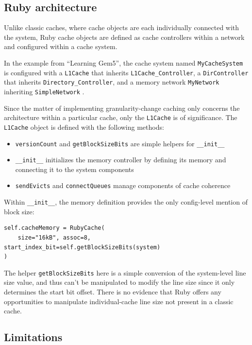 \documentclass[12pt,twoside]{reedthesis}
\begin{document}
	\subsection*{Ruby architecture}

	Unlike classic caches, where cache objects are each individually connected with the system, Ruby cache objects are defined as cache controllers within a network and configured within a cache system.
	
	In the example from ``Learning Gem5'', the cache system named \verb`MyCacheSystem` is configured with a \verb`L1Cache` that inherits \verb`L1Cache_Controller`, a \verb`DirController` that inherits \verb`Directory_Controller`, and a memory network \verb`MyNetwork` inheriting \verb`SimpleNetwork` \cite{gem5-tutorial}.

	Since the matter of implementing granularity-change caching only concerns the architecture within a particular cache, only the \verb`L1Cache` is of significance. The \verb`L1Cache` object is defined with the following methods: \begin{itemize}
		\item \verb`versionCount` and \verb`getBlockSizeBits` are simple helpers for \verb`__init__`
		\item \verb`__init__` initializes the memory controller by defining its memory and connecting it to the system components
		\item \verb`sendEvicts` and \verb`connectQueues` manage components of cache coherence
	\end{itemize}

	Within \verb`__init__`, the memory definition provides the only config-level mention of block size: \begin{verbatim}
self.cacheMemory = RubyCache(
    size="16kB", assoc=8, start_index_bit=self.getBlockSizeBits(system)
)\end{verbatim}

	The helper \verb`getBlockSizeBits` here is a simple conversion of the system-level line size value, and thus can't be manipulated to modify the line size since it only determines the start bit offset. There is no evidence that Ruby offers any opportunities to manipulate individual-cache line size not present in a classic cache.

	\subsection*{Limitations}
\end{document}
